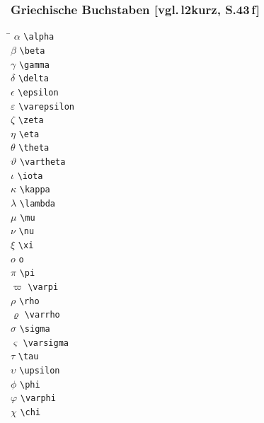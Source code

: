 \subsubsection{Griechische Buchstaben \texorpdfstring{[vgl.\,l2kurz, S.43\,f]}{}}
\negAbstand
%
\begin{multicols}{3} 
\negAbstand
\begin{tabbing}
\hspace{0.7em} \= \kill
$\alpha$			\>		\lstinline|\alpha| \\
$\beta$ 			\>		\lstinline|\beta| \\
$\gamma$ 			\>		\lstinline|\gamma| \\
$\delta$ 			\>		\lstinline|\delta| \\
$\epsilon$		\> 	\lstinline|\epsilon| \\
$\varepsilon$	\> 	\hspace{-0.4ex}\lstinline|\varepsilon| \\
$\zeta$ 			\>		\lstinline|\zeta| \\
$\eta$ 				\>		\lstinline|\eta| \\
$\theta$ 			\>		\lstinline|\theta| \\
$\vartheta$ 	\>		\lstinline|\vartheta| \\
$\iota$ 			\>		\lstinline|\iota| \\
$\kappa$ 			\>		\lstinline|\kappa| \\
$\lambda$			\> 	\lstinline|\lambda| \\
$\mu$ 				\>		\lstinline|\mu| \\
$\nu$ 				\>		\lstinline|\nu| \\
$\xi$ 				\>		\lstinline|\xi| \\
$o$ 					\>		\lstinline|o| \\
$\pi$ 				\>		\lstinline|\pi| \\
$\varpi$ 			\>		\lstinline|\varpi| \\
$\rho$ 				\>		\lstinline|\rho| \\
$\varrho$ 		\>		\lstinline|\varrho| \\
$\sigma$ 			\>		\lstinline|\sigma| \\
$\varsigma$ 	\>		\lstinline|\varsigma| \\
$\tau$ 				\>		\lstinline|\tau| \\
$\upsilon$ 		\>		\lstinline|\upsilon| \\
$\phi$ 				\>		\lstinline|\phi| \\
$\varphi$ 		\>		\lstinline|\varphi| \\
$\chi$ 				\>		\lstinline|\chi| \\

\end{tabbing}
\end{multicols}
